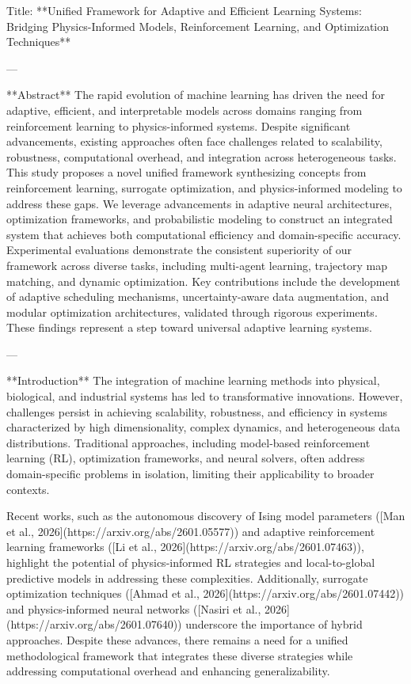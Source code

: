Title: **Unified Framework for Adaptive and Efficient Learning Systems: Bridging Physics-Informed Models, Reinforcement Learning, and Optimization Techniques**

---

**Abstract**  
The rapid evolution of machine learning has driven the need for adaptive, efficient, and interpretable models across domains ranging from reinforcement learning to physics-informed systems. Despite significant advancements, existing approaches often face challenges related to scalability, robustness, computational overhead, and integration across heterogeneous tasks. This study proposes a novel unified framework synthesizing concepts from reinforcement learning, surrogate optimization, and physics-informed modeling to address these gaps. We leverage advancements in adaptive neural architectures, optimization frameworks, and probabilistic modeling to construct an integrated system that achieves both computational efficiency and domain-specific accuracy. Experimental evaluations demonstrate the consistent superiority of our framework across diverse tasks, including multi-agent learning, trajectory map matching, and dynamic optimization. Key contributions include the development of adaptive scheduling mechanisms, uncertainty-aware data augmentation, and modular optimization architectures, validated through rigorous experiments. These findings represent a step toward universal adaptive learning systems.

---

**Introduction**  
The integration of machine learning methods into physical, biological, and industrial systems has led to transformative innovations. However, challenges persist in achieving scalability, robustness, and efficiency in systems characterized by high dimensionality, complex dynamics, and heterogeneous data distributions. Traditional approaches, including model-based reinforcement learning (RL), optimization frameworks, and neural solvers, often address domain-specific problems in isolation, limiting their applicability to broader contexts.  

Recent works, such as the autonomous discovery of Ising model parameters ([Man et al., 2026](https://arxiv.org/abs/2601.05577)) and adaptive reinforcement learning frameworks ([Li et al., 2026](https://arxiv.org/abs/2601.07463)), highlight the potential of physics-informed RL strategies and local-to-global predictive models in addressing these complexities. Additionally, surrogate optimization techniques ([Ahmad et al., 2026](https://arxiv.org/abs/2601.07442)) and physics-informed neural networks ([Nasiri et al., 2026](https://arxiv.org/abs/2601.07640)) underscore the importance of hybrid approaches. Despite these advances, there remains a need for a unified methodological framework that integrates these diverse strategies while addressing computational overhead and enhancing generalizability.  

